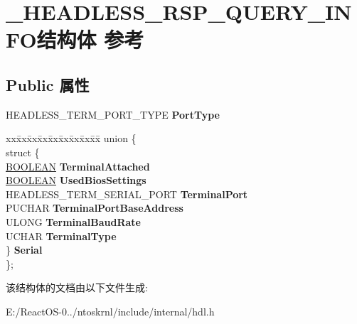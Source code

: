 \hypertarget{struct___h_e_a_d_l_e_s_s___r_s_p___q_u_e_r_y___i_n_f_o}{}\section{\+\_\+\+H\+E\+A\+D\+L\+E\+S\+S\+\_\+\+R\+S\+P\+\_\+\+Q\+U\+E\+R\+Y\+\_\+\+I\+N\+F\+O结构体 参考}
\label{struct___h_e_a_d_l_e_s_s___r_s_p___q_u_e_r_y___i_n_f_o}
\subsection*{Public 属性}
\begin{DoxyCompactItemize}
\item 
\mbox{\label{struct___h_e_a_d_l_e_s_s___r_s_p___q_u_e_r_y___i_n_f_o_ae2eced2d3899830c0c1b6c6ff3ebb709}} 
H\+E\+A\+D\+L\+E\+S\+S\+\_\+\+T\+E\+R\+M\+\_\+\+P\+O\+R\+T\+\_\+\+T\+Y\+PE {\bfseries Port\+Type}
\item 
\mbox{\label{struct___h_e_a_d_l_e_s_s___r_s_p___q_u_e_r_y___i_n_f_o_ad11208788e842011f278c6a70a2564e3}} 
\begin{tabbing}
xx\=xx\=xx\=xx\=xx\=xx\=xx\=xx\=xx\=\kill
union \{\\
\>struct \{\\
\>\>\hyperlink{_processor_bind_8h_a112e3146cb38b6ee95e64d85842e380a}{BOOLEAN} {\bfseries TerminalAttached}\\
\>\>\hyperlink{_processor_bind_8h_a112e3146cb38b6ee95e64d85842e380a}{BOOLEAN} {\bfseries UsedBiosSettings}\\
\>\>HEADLESS\_TERM\_SERIAL\_PORT {\bfseries TerminalPort}\\
\>\>PUCHAR {\bfseries TerminalPortBaseAddress}\\
\>\>ULONG {\bfseries TerminalBaudRate}\\
\>\>UCHAR {\bfseries TerminalType}\\
\>\} {\bfseries Serial}\\
\}; \\

\end{tabbing}\end{DoxyCompactItemize}


该结构体的文档由以下文件生成\+:\begin{DoxyCompactItemize}
\item 
E\+:/\+React\+O\+S-\/0../ntoskrnl/include/internal/hdl.\+h\end{DoxyCompactItemize}

